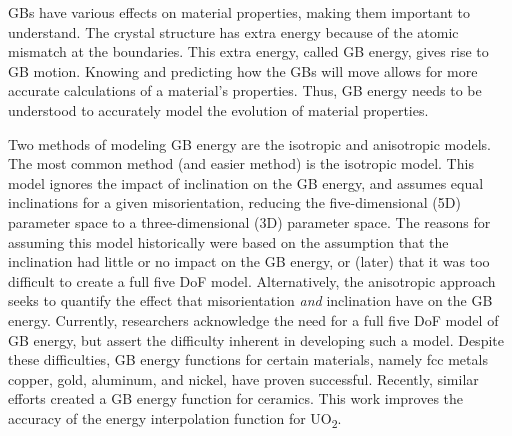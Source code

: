 \documentclass[12pt]{report}
\begin{document}
GBs have various effects on material properties, making them important to understand.\cite{patala2013, homer2015, bulatov2014}  The crystal structure has extra energy because of the atomic mismatch at the boundaries.  This extra energy, called GB energy, gives rise to GB motion.  Knowing and predicting how the GBs will move allows for more accurate calculations of a material's properties.  Thus, GB energy needs to be understood to accurately model the evolution of material properties.

Two methods of modeling GB energy are the isotropic and anisotropic models.  The most common method (and easier method) is the isotropic model.  This model ignores the impact of inclination on the GB energy, and assumes equal inclinations for a given misorientation, reducing the five-dimensional (5D) parameter space to a three-dimensional (3D) parameter space.  The reasons for assuming this model historically were based on the assumption that the inclination had little or no impact on the GB energy, or (later) that it was too difficult to create a full five DoF model.\cite{homer2015}  Alternatively, the anisotropic approach seeks to quantify the effect that misorientation \emph{and} inclination have on the GB energy.  Currently, researchers acknowledge the need for a full five DoF model of GB energy, but assert the difficulty inherent in developing such a model.\cite{rohrer2011, lejcek2010, homer2015}  Despite these difficulties, GB energy functions for certain materials, namely fcc metals copper, gold, aluminum, and nickel, have proven successful.\cite{bulatov2014} Recently,\cite{harbison2015} similar efforts created a GB energy function for ceramics.  This work improves the accuracy of the energy interpolation function for UO\textsubscript{2}.


\end{document}
